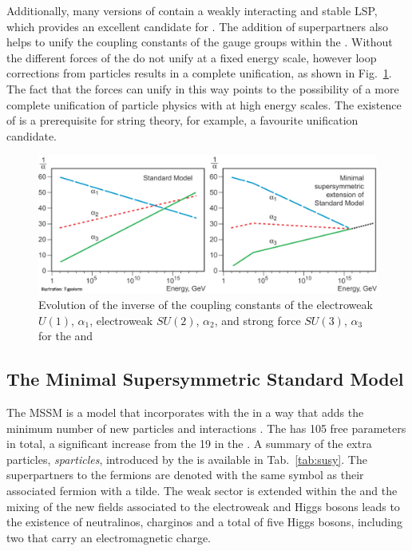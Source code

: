 Additionally, many versions of \SUSY contain a weakly interacting and
stable \acf{LSP}, which provides an excellent candidate for \DM. The
addition of superpartners also helps to unify the coupling constants
of the gauge groups within the \SM. Without \SUSY the different forces
of the \SM do not unify at a fixed energy scale, however loop
corrections from \SUSY particles results in a complete unification, as
shown in Fig.~\ref{fig:runningCoupling}. The fact that the forces can
unify in this way points to the possibility of a more complete
unification of particle physics with \GR at high energy scales. The
existence of \SUSY is a prerequisite for string theory, for example, a
favourite unification candidate.

\begin{figure}
  \includegraphics[width=1.0\linewidth]{figs/runningCouplingSusy}
  \caption[]%
  {Evolution of the inverse of the coupling constants of the
  electroweak $U(1)$, $\alpha_1$, electroweak $SU(2)$, $\alpha_2$, and
  strong force $SU(3)$, $\alpha_3$ for the \SM and \MSSM \cite{runningCoupling}}%
  \label{fig:runningCoupling}
\end{figure}

\subsection{The Minimal Supersymmetric Standard Model}
\label{sec:MSSM}

The \acf{MSSM} is a model that incorporates \SUSY with the \SM in a
way that adds the minimum number of new particles and interactions
\cite{Csaki:1996ks}. The \MSSM has 105 free parameters in total, a
significant increase from the 19 in the \SM. A summary of the extra
particles, \emph{sparticles}, introduced by the \MSSM is available in Tab.~\ref{tab:susy}.
The superpartners to the fermions are denoted with the same symbol as
their associated fermion with a tilde. The weak sector is
extended within the \MSSM and the mixing of the new \SUSY fields
associated to the electroweak and Higgs bosons leads to
the existence of neutralinos, charginos and a total of five Higgs
bosons, including two that carry an electromagnetic charge. 

